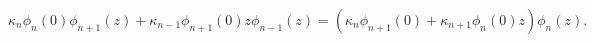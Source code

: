 \[\kappa_{n}\phi_{n}(0)\phi_{n+1}(z)+\kappa_{n-1}\phi_{n+1}(0)z\phi_{n-1}(z)=%
\left(\kappa_{n}\phi_{n+1}(0)+\kappa_{n+1}\phi_{n}(0)z\right)\phi_{n}(z).\]